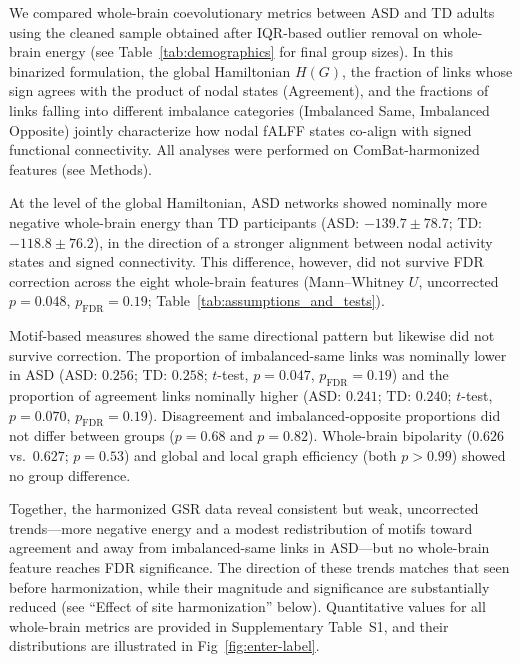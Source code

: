 \documentclass[10pt,letterpaper]{article}
\begin{document}
We compared whole-brain coevolutionary metrics between ASD and TD adults using the cleaned sample
obtained after IQR-based outlier removal on whole-brain energy (see Table~\ref{tab:demographics}
for final group sizes). In this binarized formulation, the global Hamiltonian $H(G)$, the fraction
of links whose sign agrees with the product of nodal states (Agreement), and the fractions of links
falling into different imbalance categories (Imbalanced Same, Imbalanced Opposite) jointly
characterize how nodal fALFF states co-align with signed functional connectivity. All analyses were
performed on ComBat-harmonized features (see Methods).

At the level of the global Hamiltonian, ASD networks showed nominally more negative whole-brain
energy than TD participants (ASD: $-139.7 \pm 78.7$; TD: $-118.8 \pm 76.2$), in the direction of a
stronger alignment between nodal activity states and signed connectivity. This difference, however,
did not survive FDR correction across the eight whole-brain features (Mann--Whitney $U$, uncorrected
$p = 0.048$, $p_{\mathrm{FDR}} = 0.19$; Table~\ref{tab:assumptions_and_tests}).

Motif-based measures showed the same directional pattern but likewise did not survive correction.
The proportion of imbalanced-same links was nominally lower in ASD (ASD: $0.256$; TD: $0.258$;
$t$-test, $p = 0.047$, $p_{\mathrm{FDR}} = 0.19$) and the proportion of agreement links nominally
higher (ASD: $0.241$; TD: $0.240$; $t$-test, $p = 0.070$, $p_{\mathrm{FDR}} = 0.19$). Disagreement
and imbalanced-opposite proportions did not differ between groups ($p = 0.68$ and $p = 0.82$).
Whole-brain bipolarity ($0.626$ vs.\ $0.627$; $p = 0.53$) and global and local graph efficiency
(both $p > 0.99$) showed no group difference.

Together, the harmonized GSR data reveal consistent but weak, uncorrected trends---more negative
energy and a modest redistribution of motifs toward agreement and away from imbalanced-same links in
ASD---but no whole-brain feature reaches FDR significance. The direction of these trends matches that
seen before harmonization, while their magnitude and significance are substantially reduced (see
``Effect of site harmonization'' below). Quantitative values for all whole-brain metrics are provided
in Supplementary Table~S1, and their distributions are illustrated in Fig~\ref{fig:enter-label}.
\end{document}
